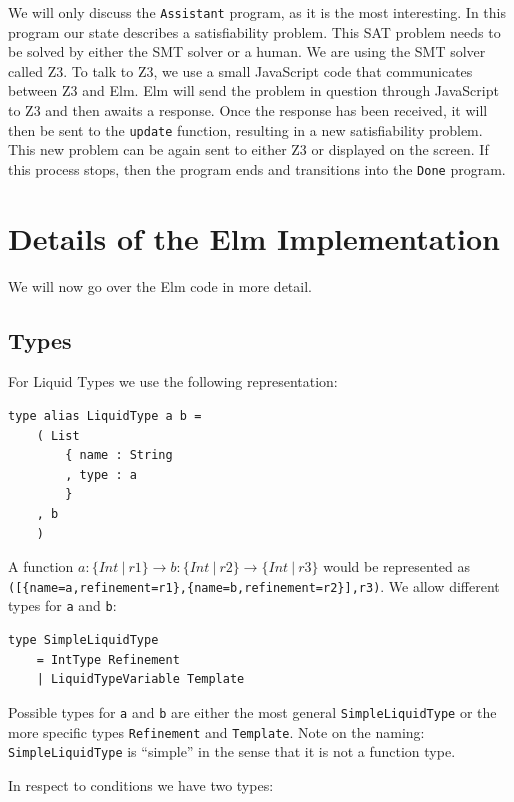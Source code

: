 \documentclass[]{scrbook}
\theoremstyle{definition}
\theoremstyle{definition}
\theoremstyle{definition}
\theoremstyle{remark}
\begin{document}
We will only discuss the \texttt{Assistant} program, as it is the most
interesting. In this program our state describes a satisfiability
problem. This SAT problem needs to be solved by either the SMT solver or
a human. We are using the SMT solver called Z3. To talk to Z3, we use a
small JavaScript code that communicates between Z3 and Elm. Elm will
send the problem in question through JavaScript to Z3 and then awaits a
response. Once the response has been received, it will then be sent to
the \texttt{update} function, resulting in a new satisfiability problem.
This new problem can be again sent to either Z3 or displayed on the
screen. If this process stops, then the program ends and transitions
into the \texttt{Done} program.

\section{Details of the Elm
Implementation}\label{details-of-the-elm-implementation}

We will now go over the Elm code in more detail.

\subsection{Types}\label{types}

For Liquid Types we use the following representation:

\begin{verbatim}
type alias LiquidType a b =
    ( List
        { name : String
        , type : a
        }
    , b
    )
\end{verbatim}

A function
\(a:\{\mathit{Int}\ |\ r1\}\to b:\{\mathit{Int}\ |\ r2\}\to\{\mathit{Int}\ |\ r3\}\)
would be represented as
\texttt{({[}\{name=a,refinement=r1\},\{name=b,refinement=r2\}{]},r3)}.
We allow different types for \texttt{a} and \texttt{b}:

\begin{verbatim}
type SimpleLiquidType
    = IntType Refinement
    | LiquidTypeVariable Template
\end{verbatim}

Possible types for \texttt{a} and \texttt{b} are either the most general
\texttt{SimpleLiquidType} or the more specific types \texttt{Refinement}
and \texttt{Template}. Note on the naming: \texttt{SimpleLiquidType} is
\enquote{simple} in the sense that it is not a function type.

In respect to conditions we have two types:
\end{document}
